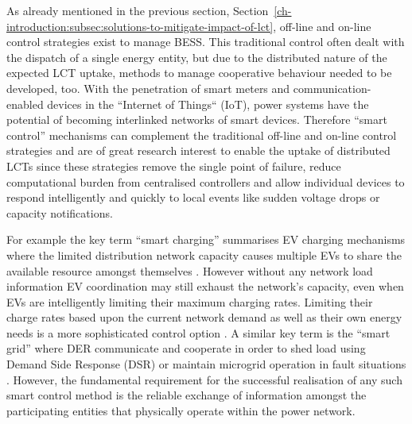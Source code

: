 
As already mentioned in the previous section, Section~\ref{ch-introduction:subsec:solutions-to-mitigate-impact-of-lct}, off-line and on-line control strategies exist to manage BESS.
This traditional control often dealt with the dispatch of a single energy entity, but due to the distributed nature of the expected LCT uptake, methods to manage cooperative behaviour needed to be developed, too.
With the penetration of smart meters and communication-enabled devices in  the ``Internet of Things`` (IoT), power systems have the potential of becoming interlinked networks of smart devices.
Therefore ``smart control'' mechanisms can complement the traditional off-line and on-line control strategies and are of great research interest to enable the uptake of distributed LCTs since these strategies remove the single point of failure, reduce computational burden from centralised controllers and allow individual devices to respond intelligently and quickly to local events like sudden voltage drops or capacity notifications.

For example the key term ``smart charging'' summarises EV charging mechanisms where the limited distribution network capacity causes multiple EVs to share the available resource amongst themselves \cite{Sortomme2011, Vaya2012, Garcia-Villalobos2014}.
However without any network load information EV coordination may still exhaust the network's capacity, even when EVs are intelligently limiting their maximum charging rates.
Limiting their charge rates based upon the current network demand as well as their own energy needs is a more sophisticated control option \cite{Karfopoulos2013}.
A similar key term is the ``smart grid'' where DER communicate and cooperate in order to  shed load using Demand Side Response (DSR) or maintain microgrid operation in fault situations \cite{Samadi2012, Liu2014, Liang2014}.
However, the fundamental requirement for the successful realisation of any such smart control method is the reliable exchange of information amongst the participating entities that physically operate within the power network.

